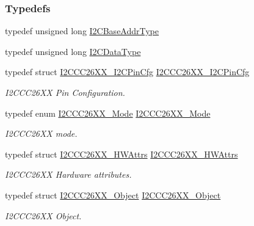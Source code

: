 \subsubsection*{Typedefs}
\begin{DoxyCompactItemize}
\item 
typedef unsigned long \hyperlink{_i2_c_c_c26_x_x_8h_a6e087d828c4463de0061d8205b2245d8}{I2\+C\+Base\+Addr\+Type}
\item 
typedef unsigned long \hyperlink{_i2_c_c_c26_x_x_8h_a5c119be60e1890af18565f27bbb8433a}{I2\+C\+Data\+Type}
\item 
typedef struct \hyperlink{struct_i2_c_c_c26_x_x___i2_c_pin_cfg}{I2\+C\+C\+C26\+X\+X\+\_\+\+I2\+C\+Pin\+Cfg} \hyperlink{_i2_c_c_c26_x_x_8h_a92eeee6e19d215804204c4830a82d424}{I2\+C\+C\+C26\+X\+X\+\_\+\+I2\+C\+Pin\+Cfg}
\begin{DoxyCompactList}\small\item\em I2\+C\+C\+C26\+X\+X Pin Configuration. \end{DoxyCompactList}\item 
typedef enum \hyperlink{_i2_c_c_c26_x_x_8h_a9deb519e150efd12ccf7068efca5ee75}{I2\+C\+C\+C26\+X\+X\+\_\+\+Mode} \hyperlink{_i2_c_c_c26_x_x_8h_a8eaf242bab570cb7c90d5108c6dca937}{I2\+C\+C\+C26\+X\+X\+\_\+\+Mode}
\begin{DoxyCompactList}\small\item\em I2\+C\+C\+C26\+X\+X mode. \end{DoxyCompactList}\item 
typedef struct \hyperlink{struct_i2_c_c_c26_x_x___h_w_attrs}{I2\+C\+C\+C26\+X\+X\+\_\+\+H\+W\+Attrs} \hyperlink{_i2_c_c_c26_x_x_8h_ab3c00c0267b7eb96f1459bfb823bdd79}{I2\+C\+C\+C26\+X\+X\+\_\+\+H\+W\+Attrs}
\begin{DoxyCompactList}\small\item\em I2\+C\+C\+C26\+X\+X Hardware attributes. \end{DoxyCompactList}\item 
typedef struct \hyperlink{struct_i2_c_c_c26_x_x___object}{I2\+C\+C\+C26\+X\+X\+\_\+\+Object} \hyperlink{_i2_c_c_c26_x_x_8h_a0eb1b66d08f9584c404d1610f8282394}{I2\+C\+C\+C26\+X\+X\+\_\+\+Object}
\begin{DoxyCompactList}\small\item\em I2\+C\+C\+C26\+X\+X Object. \end{DoxyCompactList}\end{DoxyCompactItemize}
